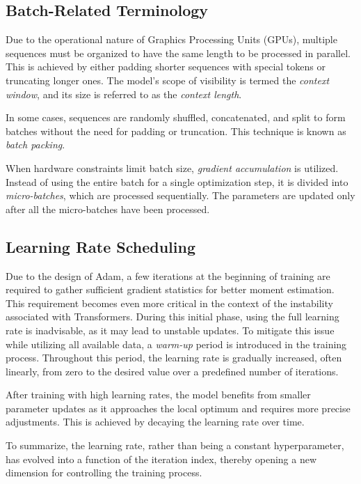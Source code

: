 \subsection{Batch-Related Terminology}

Due to the operational nature of Graphics Processing Units (GPUs), multiple sequences must be organized to have the same length to be processed in parallel. This is achieved by either padding shorter sequences with special tokens or truncating longer ones. The model's scope of visibility is termed the \textit{context window}, and its size is referred to as the \textit{context length}.

In some cases, sequences are randomly shuffled, concatenated, and split to form batches without the need for padding or truncation. This technique is known as \textit{batch packing}.

When hardware constraints limit batch size, \textit{gradient accumulation} is utilized. Instead of using the entire batch for a single optimization step, it is divided into \textit{micro-batches}, which are processed sequentially. The parameters are updated only after all the micro-batches have been processed.

\subsection{Learning Rate Scheduling}

Due to the design of Adam, a few iterations at the beginning of training are required to gather sufficient gradient statistics for better moment estimation. This requirement becomes even more critical in the context of the instability associated with Transformers. During this initial phase, using the full learning rate is inadvisable, as it may lead to unstable updates. To mitigate this issue while utilizing all available data, a \textit{warm-up} period is introduced in the training process. Throughout this period, the learning rate is gradually increased, often linearly, from zero to the desired value over a predefined number of iterations.

After training with high learning rates, the model benefits from smaller parameter updates as it approaches the local optimum and requires more precise adjustments. This is achieved by decaying the learning rate over time.

To summarize, the learning rate, rather than being a constant hyperparameter, has evolved into a function of the iteration index, thereby opening a new dimension for controlling the training process.


